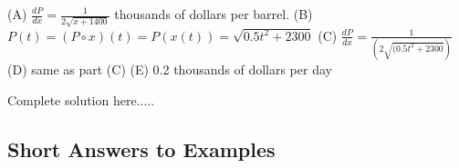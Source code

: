 \begin{example}
\begin{enumerate}[leftmargin=*]
\end{enumerate}

    \begin{sol}
    (A) $\displaystyle\frac{dP}{dx}=\frac{1}{2\sqrt{x+1400}}$ thousands of dollars per barrel.  (B) $P(t)=(P\circ x)(t)=P(x(t))=\sqrt{0.5t^2+2300}$ (C) 	$\displaystyle\frac{dP}{dx}=\frac{1}{(2\sqrt{(0.5t^2+2300})}$ (D) same as part (C) (E) 0.2 thousands of dollars per day
    \end{sol}
    \begin{solL}
    Complete solution here.....
    
    \end{solL}
    
\end{example}
\vspace*{\fill}
\subsection*{Short Answers to Examples}





